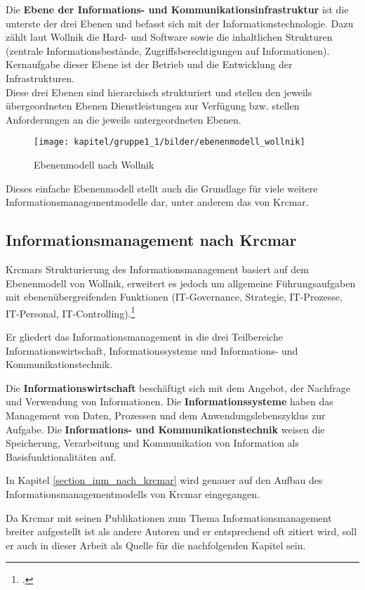 Die \textbf{Ebene der Informations- und Kommunikationsinfrastruktur} ist die unterste der drei Ebenen 
und befasst sich mit der Informationstechnologie. 
Dazu zählt laut Wollnik die Hard- und Software sowie die inhaltlichen Strukturen (zentrale Informationsbestände, Zugriffsberechtigungen auf Informationen). Kernaufgabe dieser Ebene ist der Betrieb und die Entwicklung der Infrastrukturen.\\

Diese drei Ebenen sind hierarchisch strukturiert und stellen den jeweils übergeordneten Ebenen Dienstleistungen zur Verfügung bzw. stellen Anforderungen an die jeweils untergeordneten Ebenen. 

\begin{figure}[h!]
	\centering
	\texttt{[image: kapitel/gruppe1\_1/bilder/ebenenmodell\_wollnik]}
	\caption{Ebenenmodell nach Wollnik}
	\label{fig_ebenenmodell_wollnik}
\end{figure}

Dieses einfache Ebenenmodell stellt auch die Grundlage für viele weitere Informationsmanagementmodelle dar, unter anderem das von Krcmar.

\subsection{Informationsmanagement nach Krcmar}
Krcmars Strukturierung des Informationsmanagement basiert auf dem Ebenenmodell von Wollnik, erweitert es jedoch um allgemeine Führungsaufgaben mit ebenenübergreifenden Funktionen (IT-Governance, Strategie, IT-Prozesse, IT-Personal, IT-Controlling).\footcite{krcmar_informationsmanagement_2015}

Er gliedert das Informationsmanagement in die drei Teilbereiche Informationswirtschaft, Informationssysteme und Informations- und Kommunikationstechnik.

Die \textbf{Informationswirtschaft} beschäftigt sich mit dem Angebot, der Nachfrage und Verwendung von Informationen.
Die \textbf{Informationssysteme} haben das Management von Daten, Prozessen und dem Anwendungslebenszyklus zur Aufgabe.
Die \textbf{Informations- und Kommunikationstechnik} weisen die Speicherung, Verarbeitung und Kommunikation von Information als Basisfunktionalitäten auf.

In Kapitel \ref{section_inm_nach_krcmar} wird genauer auf den Aufbau des Informationsmanagementmodells von Krcmar eingegangen.

Da Krcmar mit seinen Publikationen zum Thema Informationsmanagement breiter aufgestellt ist als andere Autoren und er entsprechend oft zitiert wird, soll er auch in dieser Arbeit als Quelle für die nachfolgenden Kapitel sein. 

